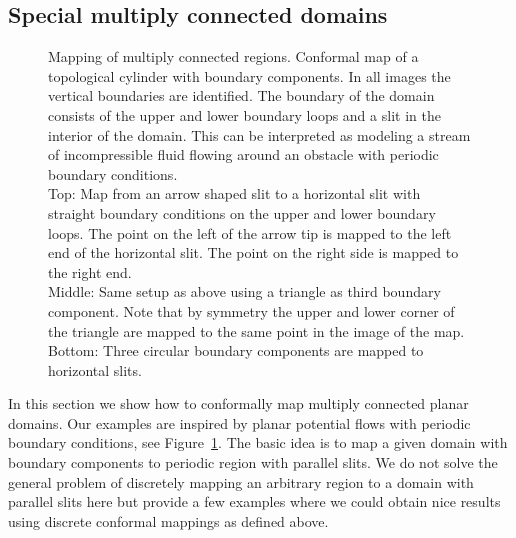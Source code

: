 \documentclass[Thesis]{subfiles}
\begin{document}
\subsection{Special multiply connected domains}

\begin{figure}
	\centering
\caption{
Mapping of multiply connected regions.
Conformal map of a topological cylinder with boundary components.
In all images the vertical boundaries are identified.
The boundary of the domain consists of the upper and lower boundary loops and a slit in the interior of the domain.
This can be interpreted as modeling a stream of incompressible fluid flowing around an obstacle with periodic boundary conditions.
\\
Top: Map from an arrow shaped slit to a horizontal slit with straight boundary conditions on the upper and lower boundary loops.
The point on the left of the arrow tip is mapped to the left end of the horizontal slit.
The point on the right side is mapped to the right end.
\\
Middle: Same setup as above using a triangle as third boundary component.
Note that by symmetry the upper and lower corner of the triangle are mapped to the same point in the image of the map.
\\
Bottom: Three circular boundary components are mapped to horizontal slits.
}
\label{fig:fluid_flows}
\end{figure}

In this section we show how to conformally map multiply connected planar domains.
Our examples are inspired by planar potential flows with periodic boundary conditions, see Figure~\ref{fig:fluid_flows}.
The basic idea is to map a given domain with boundary components to periodic region with parallel slits.
We do not solve the general problem of discretely mapping an arbitrary region to a domain with parallel slits here but provide a few examples where we could obtain nice results using discrete conformal mappings as defined above.
\end{document}
